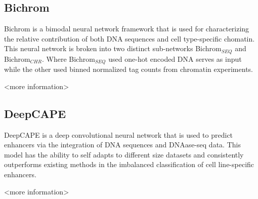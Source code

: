 \subsection*{Bichrom}

Bichrom is a bimodal neural network framework that is used for characterizing the relative contribution of both DNA sequences and cell type-specific chomatin. This neural network is broken into two distinct sub-networks Bichrom$_{SEQ}$ and Bichrom$_{CHR}$. Where Bichrom$_{SEQ}$ used one-hot encoded DNA serves as input while the other used binned normalized tag counts from chromatin experiments.

<more information>

\subsection*{DeepCAPE}

DeepCAPE is a deep convolutional neural network that is used to predict enhancers via the integration of DNA sequences and DNAase-seq data. This model has the ability to self adapts to different size datasets and consistently outperforms existing methods in the imbalanced classification of cell line-specific enhancers.

<more information>



